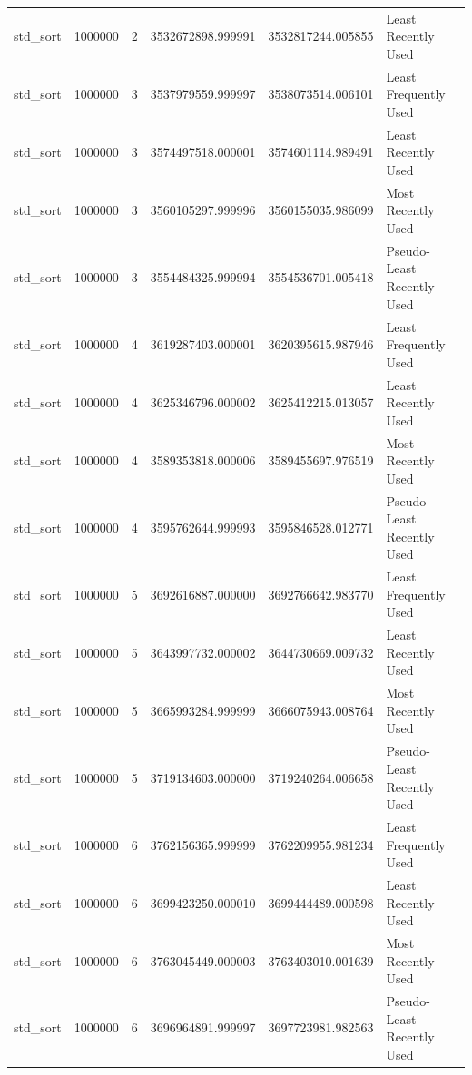 \begin{tabular}{llrrrl}
std_sort & 1000000 & 2 & 3532672898.999991 & 3532817244.005855 & Least Recently Used \\
std_sort & 1000000 & 3 & 3537979559.999997 & 3538073514.006101 & Least Frequently Used \\
std_sort & 1000000 & 3 & 3574497518.000001 & 3574601114.989491 & Least Recently Used \\
std_sort & 1000000 & 3 & 3560105297.999996 & 3560155035.986099 & Most Recently Used \\
std_sort & 1000000 & 3 & 3554484325.999994 & 3554536701.005418 & Pseudo-Least Recently Used \\
std_sort & 1000000 & 4 & 3619287403.000001 & 3620395615.987946 & Least Frequently Used \\
std_sort & 1000000 & 4 & 3625346796.000002 & 3625412215.013057 & Least Recently Used \\
std_sort & 1000000 & 4 & 3589353818.000006 & 3589455697.976519 & Most Recently Used \\
std_sort & 1000000 & 4 & 3595762644.999993 & 3595846528.012771 & Pseudo-Least Recently Used \\
std_sort & 1000000 & 5 & 3692616887.000000 & 3692766642.983770 & Least Frequently Used \\
std_sort & 1000000 & 5 & 3643997732.000002 & 3644730669.009732 & Least Recently Used \\
std_sort & 1000000 & 5 & 3665993284.999999 & 3666075943.008764 & Most Recently Used \\
std_sort & 1000000 & 5 & 3719134603.000000 & 3719240264.006658 & Pseudo-Least Recently Used \\
std_sort & 1000000 & 6 & 3762156365.999999 & 3762209955.981234 & Least Frequently Used \\
std_sort & 1000000 & 6 & 3699423250.000010 & 3699444489.000598 & Least Recently Used \\
std_sort & 1000000 & 6 & 3763045449.000003 & 3763403010.001639 & Most Recently Used \\
std_sort & 1000000 & 6 & 3696964891.999997 & 3697723981.982563 & Pseudo-Least Recently Used \\
\bottomrule
\end{tabular}
